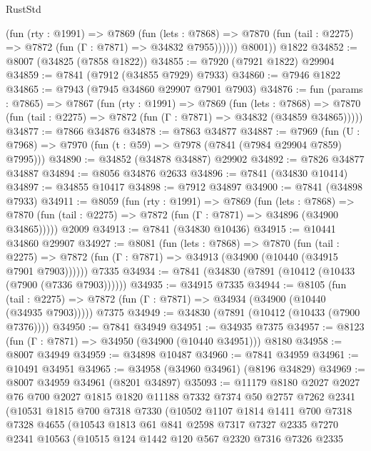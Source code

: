 \begin{lexlean}{RustStd}
\begin{coremodule}
            (fun (rty : @1991) =>
            @7869
              (fun (lets : @7868) =>
              @7870 (fun (tail : @2275) => @7872 (fun (Γ : @7871) => @34832 @7955))))))
        @8001))
    @1822
@34852 := @8007 (@34825 (@7858 @1822))
@34855 := @7920 (@7921 @1822) @29904
@34859 := @7841 (@7912 (@34855 @7929) @7933)
@34860 := @7946 @1822
@34865 := @7943 (@7945 @34860 @29907 @7901 @7903)
@34876 := fun (params : @7865) =>
  @7867
    (fun (rty : @1991) =>
    @7869
      (fun (lets : @7868) =>
      @7870 (fun (tail : @2275) => @7872 (fun (Γ : @7871) => @34832 (@34859 @34865)))))
@34877 := @7866 @34876
@34878 := @7863 @34877
@34887 := @7969
    (fun (U : @7968) => @7970 (fun (t : @59) => @7978 (@7841 (@7984 @29904 @7859) @7995)))
@34890 := @34852 (@34878 @34887) @29902
@34892 := @7826 @34877 @34887
@34894 := @8056 @34876 @2633
@34896 := @7841 (@34830 @10414)
@34897 := @34855 @10417
@34898 := @7912 @34897
@34900 := @7841 (@34898 @7933)
@34911 := @8059
    (fun (rty : @1991) =>
    @7869
      (fun (lets : @7868) =>
      @7870 (fun (tail : @2275) => @7872 (fun (Γ : @7871) => @34896 (@34900 @34865)))))
    @2009
@34913 := @7841 (@34830 @10436)
@34915 := @10441 @34860 @29907
@34927 := @8081
    (fun (lets : @7868) =>
    @7870
      (fun (tail : @2275) =>
      @7872 (fun (Γ : @7871) => @34913 (@34900 (@10440 (@34915 @7901 @7903))))))
    @7335
@34934 := @7841 (@34830 (@7891 (@10412 (@10433 (@7900 (@7336 @7903))))))
@34935 := @34915 @7335
@34944 := @8105
    (fun (tail : @2275) => @7872 (fun (Γ : @7871) => @34934 (@34900 (@10440 (@34935 @7903)))))
    @7375
@34949 := @34830 (@7891 (@10412 (@10433 (@7900 @7376))))
@34950 := @7841 @34949
@34951 := @34935 @7375
@34957 := @8123 (fun (Γ : @7871) => @34950 (@34900 (@10440 @34951))) @8180
@34958 := @8007 @34949
@34959 := @34898 @10487
@34960 := @7841 @34959
@34961 := @10491 @34951
@34965 := @34958 (@34960 @34961) (@8196 @34829)
@34969 := @8007 @34959 @34961 (@8201 @34897)
@35093 := @11179
    @8180
    @2027
    @2027
    @76
    @700
    @2027
    @1815
    @1820
    @11188
    @7332
    @7374
    @50
    @2757
    @7262
    @2341
    (@10531
      @1815
      @700
      @7318
      @7330
      (@10502
        @1107
        @1814
        @1411
        @700
        @7318
        @7328
        @4655
        (@10543
          @1813
          @61
          @841
          @2598
          @7317
          @7327
          @2335
          @7270
          @2341
          @10563
          (@10515
            @124
            @1442
            @120
            @567
            @2320
            @7316
            @7326
            @2335

\end{coremodule}
\end{lexlean}
